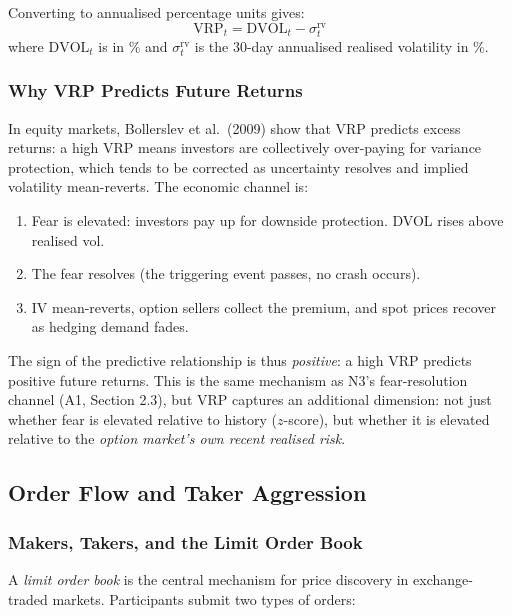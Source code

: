 \documentclass[12pt, a4paper]{article}
\theoremstyle{plain}
\theoremstyle{definition}
\newcommand{\DVOL}{\mathrm{DVOL}}
\newcommand{\VRP}{\mathrm{VRP}}
\begin{document}
Converting to annualised percentage units gives:
\begin{equation}
  \VRP_t = \DVOL_t - \sigma^{\mathrm{rv}}_t
  \label{eq:vrp_empirical}
\end{equation}
where $\DVOL_t$ is in \% and $\sigma^{\mathrm{rv}}_t$ is the 30-day
annualised realised volatility in \%.

\subsubsection{Why VRP Predicts Future Returns}

In equity markets, Bollerslev et al.\ (2009) show that VRP
predicts excess returns: a high VRP means investors are collectively
over-paying for variance protection, which tends to be corrected as
uncertainty resolves and implied volatility mean-reverts.  The economic
channel is:

\begin{enumerate}
  \item Fear is elevated: investors pay up for downside protection.
        DVOL rises above realised vol.
  \item The fear resolves (the triggering event passes, no crash occurs).
  \item IV mean-reverts, option sellers collect the premium, and spot
        prices recover as hedging demand fades.
\end{enumerate}

The sign of the predictive relationship is thus \emph{positive}: a high
VRP predicts positive future returns.  This is the same mechanism as
N3's fear-resolution channel (A1, Section 2.3), but VRP captures an
additional dimension: not just whether fear is elevated relative to
history ($z$-score), but whether it is elevated relative to the
\emph{option market's own recent realised risk}.

\subsection{Order Flow and Taker Aggression}
\label{sec:taker_theory}

\subsubsection{Makers, Takers, and the Limit Order Book}

A \emph{limit order book} is the central mechanism for price discovery
in exchange-traded markets.  Participants submit two types of orders:
\end{document}
